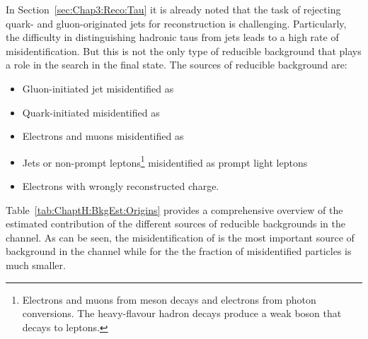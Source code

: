 In Section~\ref{sec:Chap3:Reco:Tau} it is already noted that the task of rejecting 
quark- and gluon-originated jets for \tauhad reconstruction is challenging. 
Particularly, the difficulty in distinguishing hadronic taus 
from jets leads to a high rate of misidentification. %
But this is not the only type of reducible background that plays a role in the 
\tHq search in the \dileptau final state. The sources of reducible background are:
\begin{itemize}
	\item Gluon-initiated jet misidentified as \tauhad
	\item Quark-initiated misidentified as \tauhad
	\item Electrons and muons misidentified as \tauhad
	\item Jets or non-prompt leptons\footnote{ Electrons and muons from meson decays and electrons from photon conversions. The heavy-flavour hadron decays produce a weak boson that decays to leptons.} misidentified as prompt light leptons
	\item Electrons with wrongly reconstructed charge. 
\end{itemize}

Table~\ref{tab:ChaptH:BkgEst:Origins} provides a comprehensive overview of the estimated contribution of the different
sources of reducible backgrounds in the \dileptau channel. As can be seen, the misidentification of \tauhad is the most important
source of background in the \dilepOStau channel while for the \dilepSStau the fraction of misidentified particles is much smaller. 

